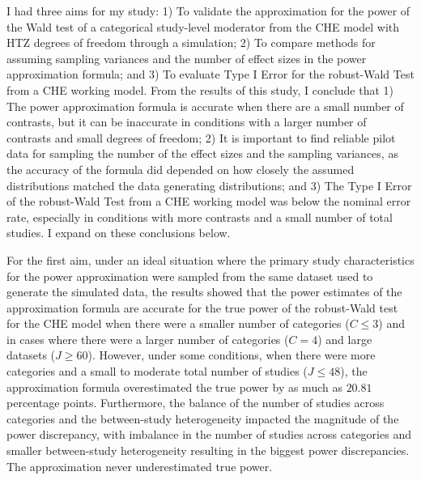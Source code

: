 I had three aims for my study: 1) To validate the approximation for the power of the Wald test of a categorical study-level moderator from the CHE model with HTZ degrees of freedom through a simulation; 2) To compare methods for assuming sampling variances and the number of effect sizes in the power approximation formula; and 3) To evaluate Type I Error for the robust-Wald Test from a CHE working model. From the results of this study, I conclude that 1) The power approximation formula is accurate when there are a small number of contrasts, but it can be inaccurate in conditions with a larger number of contrasts and small degrees of freedom; 2) It is important to find reliable pilot data for sampling the number of the effect sizes and the sampling variances, as the accuracy of the formula did depended on how closely the assumed distributions matched the data generating distributions; and 3) The Type I Error of the robust-Wald Test from a CHE working model was below the nominal error rate, especially in conditions with more contrasts and a small number of total studies. I expand on these conclusions below.  

For the first aim, under an ideal situation where the primary study characteristics for the power approximation were sampled from the same dataset used to generate the simulated data, the results showed that the power estimates of the approximation formula are accurate for the true power of the robust-Wald test for the CHE model when there were a smaller number of categories ($C \leq 3$) and in cases where there were a larger number of categories ($C = 4$) and large datasets ($J \geq 60$). However, under some conditions, when there were more categories and a small to moderate total number of studies ($J \leq 48$), the approximation formula overestimated the true power by as much as $20.81$ percentage points. Furthermore, the balance of the number of studies across categories and the between-study heterogeneity impacted the magnitude of the power discrepancy, with imbalance in the number of studies across categories and smaller between-study heterogeneity resulting in the biggest power discrepancies. The approximation never underestimated true power. 


